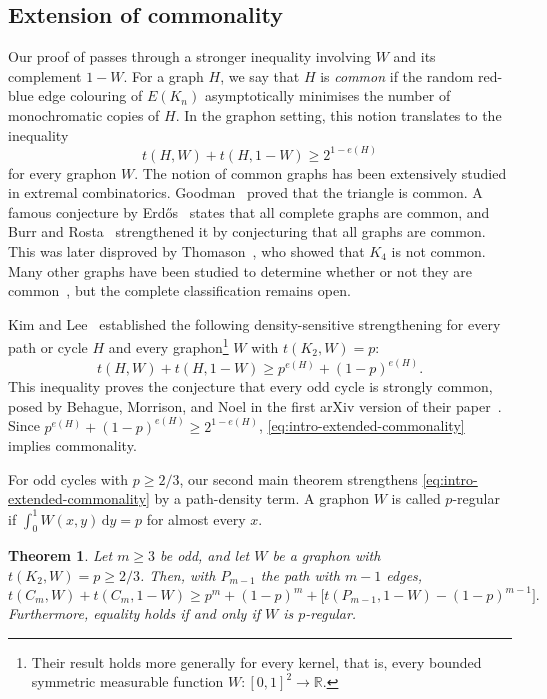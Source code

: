 \documentclass[11pt]{article}
\newtheorem{theorem}{Theorem}[section]
\theoremstyle{remark}
\numberwithin{equation}{section}
\newcommand{\dd}{\,\mathrm d}
\newcommand{\dens}[2]{t(#1,#2)}
\newcommand{\tC}[2]{t(C_{#1},#2)}
\newcommand{\tP}[2]{t(P_{#1},#2)}
\newcommand{\edens}[1]{t(K_{2},#1)}
\begin{document}
\subsection{Extension of commonality}
Our proof of  passes through a stronger inequality involving $W$ and its complement $1-W$.
For a graph $H$, we say that $H$ is \emph{common} if the random red-blue edge colouring of $E(K_n)$ asymptotically minimises the number of monochromatic copies of $H$.
In the graphon setting, this notion translates to the inequality
\[
  \dens HW+\dens H{1-W}\ge2^{1-e(H)}
\]
for every graphon $W$.
The notion of common graphs has been extensively studied in extremal combinatorics. 
Goodman~\cite{goodman1959sets} proved that the triangle is common.
A famous conjecture by Erd\H{o}s~\cite{erdos1962number} states that all complete graphs are common, and Burr and Rosta~\cite{burr1980ramsey} strengthened it by conjecturing that all graphs are common.
This was later disproved by Thomason~\cite{thomason1989disproof}, who showed that $K_4$ is not common.
Many other graphs have been studied to determine whether or not they are common~\cite{grzesik2022tripartite,hatami2012non,jagger1996multiplicities,ko2023common,kral2025common,lee2026disconnected,sidorenko1989cycles}, but the complete classification remains open.

Kim and Lee~\cite{kim2024extended} established the following density-sensitive strengthening for every path or cycle $H$ and every graphon\footnote{Their result holds more generally for every kernel, that is, every bounded symmetric measurable function $W\colon[0,1]^2\to\mathbb{R}$.} $W$ with $\edens W=p$:
\begin{equation}\label{eq:intro-extended-commonality}
  \dens HW+\dens H{1-W}\ge p^{e(H)}+(1-p)^{e(H)}.
\end{equation}
This inequality proves the conjecture that every odd cycle is strongly common, posed by Behague, Morrison, and Noel in the first arXiv version of their paper~\cite[Conjecture~9.7]{behague2022commonv1}.
Since $p^{e(H)}+(1-p)^{e(H)}\ge2^{1-e(H)}$, \eqref{eq:intro-extended-commonality} implies commonality.


For odd cycles with $p\ge2/3$, our second main theorem strengthens \eqref{eq:intro-extended-commonality} by a path-density term.
A graphon $W$ is called $p$-regular if $\int_0^1 W(x,y)\dd y=p$ for almost every $x$.

\begin{theorem}\label{thm:commonality}
  Let $m\ge3$ be odd, and let $W$ be a graphon with $\edens W=p\ge2/3$.
  Then, with $P_{m-1}$ the path with $m-1$ edges,
  \begin{equation}\label{eq:intro-commonality}
    \tC mW+\tC m{1-W}\ge p^m+(1-p)^m+\bigl[\tP{m-1}{1-W}-(1-p)^{m-1}\bigr].
  \end{equation}
  Furthermore, equality holds if and only if $W$ is $p$-regular.
\end{theorem}
\end{document}
